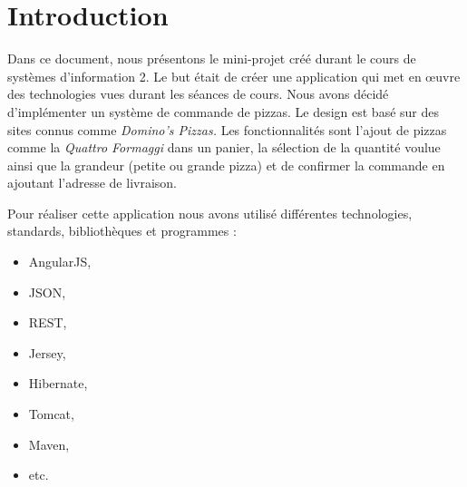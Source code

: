 \section*{Introduction}
\setcounter{page}{1}

Dans ce document, nous présentons le mini-projet créé durant le cours de systèmes d'information 2. Le but était de créer une application qui met en \oe{}uvre des technologies vues durant les séances de cours.
Nous avons décidé d'implémenter un système de commande de pizzas. Le design est basé sur des sites connus comme \emph{Domino's Pizzas.} Les fonctionnalités sont l'ajout de pizzas comme la \emph{Quattro Formaggi} dans un panier, la sélection de la quantité voulue ainsi que la grandeur (petite ou grande pizza) et de confirmer la commande en ajoutant l'adresse de livraison.

Pour réaliser cette application nous avons utilisé différentes technologies, standards, bibliothèques et programmes :
\begin{itemize}
    \item AngularJS,
    \item JSON,
    \item REST,
    \item Jersey,
    \item Hibernate,
    \item Tomcat,
    \item Maven,
    \item etc.
\end{itemize}
